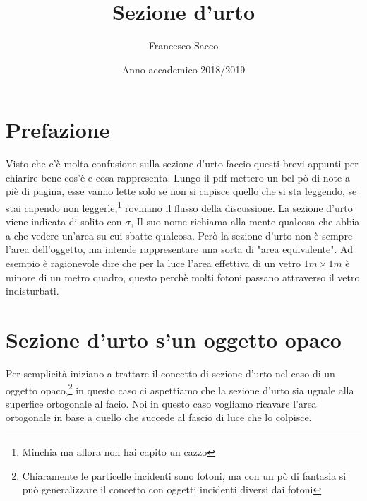\documentclass[11pt,a4paper]{article}
\date{{\LARGE Anno accademico 2018/2019}}
\title{{\myfont Sezione d'urto}}
\author{{\Huge Francesco Sacco}}
\begin{document}
	\maketitle
	\tableofcontents
	\newpage
	\section*{Prefazione}
		Visto che c'è molta confusione sulla sezione d'urto faccio questi brevi appunti per chiarire bene cos'è e cosa rappresenta.\newline
		Lungo il pdf mettero un bel pò di note a piè di pagina, esse vanno lette solo se non si capisce quello che si sta leggendo, se stai capendo non leggerle,\footnote{Minchia ma allora non hai capito un cazzo} rovinano il flusso della discussione.\newline 
		La sezione d'urto viene indicata di solito con $\sigma$, Il suo nome richiama alla mente qualcosa che abbia a che vedere un'area su cui sbatte qualcosa. Però la sezione d'urto non è sempre l'area dell'oggetto, ma intende rappresentare una sorta di "area equivalente".\newline
		Ad esempio è ragionevole dire che per la luce l'area effettiva di un vetro $1m\times 1m$ è minore di un metro quadro, questo perchè molti fotoni passano attraverso il vetro indisturbati.\newline
	\section{Sezione d'urto s'un oggetto opaco}
	\label{sec:opaco}
		Per semplicità iniziano a trattare il concetto di sezione d'urto nel caso di un oggetto opaco,\footnote{Chiaramente le particelle incidenti sono fotoni, ma con un pò di fantasia si può generalizzare il concetto con oggetti incidenti diversi dai fotoni} in questo caso ci aspettiamo che la sezione d'urto sia uguale alla superfice ortogonale al facio.\newline
		Noi in questo caso vogliamo ricavare l'area ortogonale in base a quello che succede al fascio di luce che lo colpisce.\newline
\end{document}
